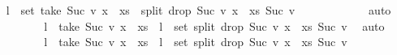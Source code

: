 \begin{isabellebody}
\ \isamarkupfalse%
\ {\isachardoublequoteopen}l\ {\isasymin}\ set\ {\isacharparenleft}{\kern0pt}{\isacharparenleft}{\kern0pt}take\ {\isacharparenleft}{\kern0pt}Suc\ v{\isacharparenright}{\kern0pt}\ {\isacharparenleft}{\kern0pt}x\ {\isacharhash}{\kern0pt}\ xs{\isacharparenright}{\kern0pt}{\isacharparenright}{\kern0pt}\ {\isacharhash}{\kern0pt}\ {\isacharparenleft}{\kern0pt}split\ {\isacharparenleft}{\kern0pt}drop\ {\isacharparenleft}{\kern0pt}Suc\ v{\isacharparenright}{\kern0pt}\ {\isacharparenleft}{\kern0pt}x\ {\isacharhash}{\kern0pt}\ xs{\isacharparenright}{\kern0pt}{\isacharparenright}{\kern0pt}\ {\isacharparenleft}{\kern0pt}Suc\ v{\isacharparenright}{\kern0pt}{\isacharparenright}{\kern0pt}{\isacharparenright}{\kern0pt}{\isachardoublequoteclose}\isanewline
\ \ \ \ \ \ \ \ \isamarkupfalse%
\ {}{\isacharparenleft}{\kern0pt}{}{\isacharparenright}{\kern0pt}\ \isamarkupfalse%
\ auto\isanewline
\isanewline
\ \ \ \ \ \ \isamarkupfalse%
\ \isamarkupfalse%
\ {\isachardoublequoteopen}l\ {\isacharequal}{\kern0pt}\ take\ {\isacharparenleft}{\kern0pt}Suc\ v{\isacharparenright}{\kern0pt}\ {\isacharparenleft}{\kern0pt}x\ {\isacharhash}{\kern0pt}\ xs{\isacharparenright}{\kern0pt}\ {\isasymor}\ l\ {\isasymin}\ set\ {\isacharparenleft}{\kern0pt}split\ {\isacharparenleft}{\kern0pt}drop\ {\isacharparenleft}{\kern0pt}Suc\ v{\isacharparenright}{\kern0pt}\ {\isacharparenleft}{\kern0pt}x\ {\isacharhash}{\kern0pt}\ xs{\isacharparenright}{\kern0pt}{\isacharparenright}{\kern0pt}\ {\isacharparenleft}{\kern0pt}Suc\ v{\isacharparenright}{\kern0pt}{\isacharparenright}{\kern0pt}{\isachardoublequoteclose}\ \isamarkupfalse%
\ auto\isanewline
\ \ \ \ \ \ \isamarkupfalse%
\ \isamarkupfalse%
\ {\isachardoublequoteopen}l\ {\isacharequal}{\kern0pt}\ {\isacharparenleft}{\kern0pt}take\ {\isacharparenleft}{\kern0pt}Suc\ v{\isacharparenright}{\kern0pt}\ {\isacharparenleft}{\kern0pt}x\ {\isacharhash}{\kern0pt}\ xs{\isacharparenright}{\kern0pt}{\isacharparenright}{\kern0pt}{\isachardoublequoteclose}\ {\isacharbar}{\kern0pt}\ {\isachardoublequoteopen}l\ {\isasymin}\ set\ {\isacharparenleft}{\kern0pt}split\ {\isacharparenleft}{\kern0pt}drop\ {\isacharparenleft}{\kern0pt}Suc\ v{\isacharparenright}{\kern0pt}\ {\isacharparenleft}{\kern0pt}x\ {\isacharhash}{\kern0pt}\ xs{\isacharparenright}{\kern0pt}{\isacharparenright}{\kern0pt}\ {\isacharparenleft}{\kern0pt}Suc\ v{\isacharparenright}{\kern0pt}{\isacharparenright}{\kern0pt}{\isachardoublequoteclose}\ \isamarkupfalse%

\end{isabellebody}
